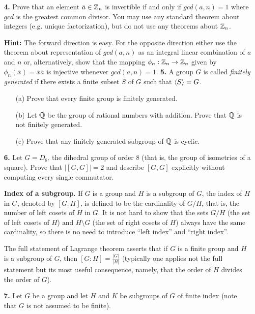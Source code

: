 \documentclass[12pt]{amsart}
\begin{document}
{\bf 4.} Prove that an element $\bar a\in{\mathbb Z}_n$ is invertible if and only if $gcd(a,n)=1$
where $gcd$ is the greatest common divisor. You may use any standard theorem about integers
(e.g. unique factorization), but do not use any theorems about ${\mathbb Z}_n$.

{\bf Hint: } The forward direction is easy. For the opposite direction
either use the theorem about representation of $gcd(a,n)$ as an integral linear 
combination of $a$ and $n$ or, alternatively, show that the mapping $\phi_n:{\mathbb Z}_n\to{\mathbb Z}_n$
given by  $\phi_n(\bar x)=\bar x\bar a$ is injective whenever $gcd(a,n)=1$.
\skv
{\bf 5.} A group $G$ is called {\it finitely generated} if there exists a finite subset $S$ of $G$ such that
${\langle} S{\rangle}=G$.
\begin{itemize}
\item[(a)] Prove that every finite group is finitely generated. 

\item[(b)] Let ${\mathbb Q}$ be the group of rational numbers with addition. Prove that ${\mathbb Q}$
is not finitely generated. 

\item[(c)] Prove that any finitely generated subgroup of ${\mathbb Q}$ is cyclic.
\end{itemize}

{\bf 6.} Let $G=D_8$, the dihedral group of order $8$ (that is, the group of isometries of a square). Prove that $|[G,G]|=2$ and describe $[G,G]$
explicitly without computing every single commutator. 


\skv
{\bf Index of a subgroup.} If $G$ is a group and $H$ is a subgroup of $G$, the index of $H$ in $G$, denoted by $[G:H]$, is
defined to be the cardinality of $G/H$, that is, the number of left cosets of $H$ in $G$.
It is not hard to show that the sets $G/H$ (the set of left cosets of $H$) and
$H\setminus G$ (the set of right cosets of $H$) always have the same cardinality, so there is no need to introduce ``left index'' and ``right index''. 

The full statement of Lagrange theorem asserts that if $G$ is a finite group and $H$ is a subgroup of $G$, then $[G:H]=\frac{|G|}{|H|}$ (typically one applies not the full statement but its most useful consequence, namely, that the order of $H$ divides the order of $G$).
\skv




{\bf 7.} Let $G$ be a group and let $H$ and $K$ be subgroups of $G$ of finite index
(note that $G$ is not assumed to be finite).
\end{document}
